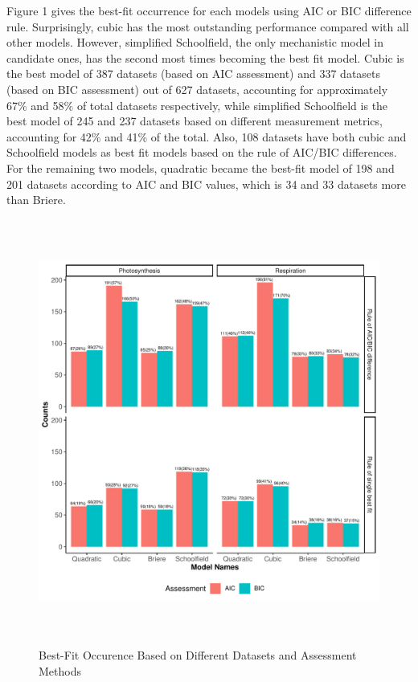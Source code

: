 \documentclass[11pt]{article}
\begin{document}
Figure 1 gives the best-fit occurrence for each models using AIC or BIC difference rule. Surprisingly, cubic has the most outstanding performance compared with all other models. However, simplified Schoolfield, the only mechanistic model in candidate ones, has the second most times becoming the best fit model. Cubic is the best model of 387 datasets (based on AIC assessment) and 337 datasets (based on BIC assessment) out of 627 datasets, accounting for approximately 67\% and 58\% of total datasets respectively, while simplified Schoolfield is the best model of 245 and 237 datasets based on different measurement metrics, accounting for 42\% and 41\% of the total. Also, 108 datasets have both cubic and Schoolfield models as best fit models based on the rule of AIC/BIC differences. For the remaining two models, quadratic became the best-fit model of 198 and 201 datasets according to AIC and BIC values, which is 34 and 33 datasets more than Briere. 

\begin{figure}[H]
    \center
    \includegraphics[height = 14cm, width = 15cm]{../Results/Results_backup/images/bestfit_grouped_rule2.pdf}
    \caption{Best-Fit Occurence Based on Different Datasets and Assessment Methods}
\end{figure}
\end{document}
